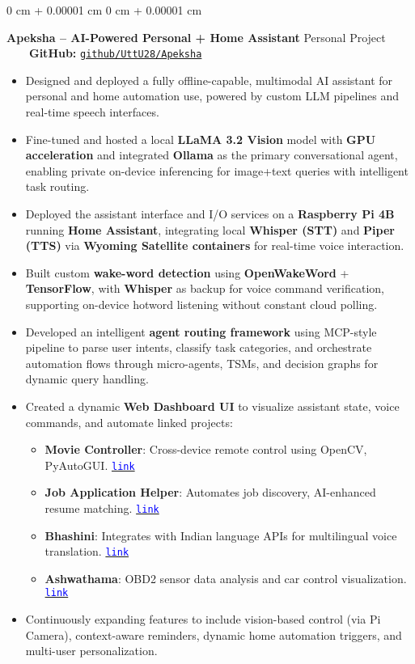 \documentclass[10pt, letterpaper]{article}
\newenvironment{highlights}{
    \begin{itemize}[
        topsep=0.10 cm,
        parsep=0.10 cm,
        partopsep=0pt,
        itemsep=0pt,
        leftmargin=0 cm + 10pt
    ]
}{
    \end{itemize}
} %
\newenvironment{onecolentry}{
    \begin{adjustwidth}{
        0 cm + 0.00001 cm
    }{
        0 cm + 0.00001 cm
    }
}{
    \end{adjustwidth}
} %
\begin{document}
\begin{onecolentry}
	\textbf{Apeksha – AI-Powered Personal + Home Assistant} \hfill Personal Project \ \ \ \ \textbf{GitHub:} \href{https://github.com/UttU28/Apeksha}{\texttt{github/UttU28/Apeksha}}
	
	\begin{highlights}
		\item Designed and deployed a fully offline-capable, multimodal AI assistant for personal and home automation use, powered by custom LLM pipelines and real-time speech interfaces.
		\item Fine-tuned and hosted a local \textbf{LLaMA 3.2 Vision} model with \textbf{GPU acceleration} and integrated \textbf{Ollama} as the primary conversational agent, enabling private on-device inferencing for image+text queries with intelligent task routing.
		\item Deployed the assistant interface and I/O services on a \textbf{Raspberry Pi 4B} running \textbf{Home Assistant}, integrating local \textbf{Whisper (STT)} and \textbf{Piper (TTS)} via \textbf{Wyoming Satellite containers} for real-time voice interaction.
		\item Built custom \textbf{wake-word detection} using \textbf{OpenWakeWord} + \textbf{TensorFlow}, with \textbf{Whisper} as backup for voice command verification, supporting on-device hotword listening without constant cloud polling.
		\item Developed an intelligent \textbf{agent routing framework} using MCP-style pipeline to parse user intents, classify task categories, and orchestrate automation flows through micro-agents, TSMs, and decision graphs for dynamic query handling.
		\item Created a dynamic \textbf{Web Dashboard UI} to visualize assistant state, voice commands, and automate linked projects:
			\begin{highlights}
				\item \textbf{Movie Controller}: Cross-device remote control using OpenCV, PyAutoGUI. \href{https://github.com/UttU28/Movie_Controller_2}{\textcolor{blue}{\texttt{link}}}
				\item \textbf{Job Application Helper}: Automates job discovery, AI-enhanced resume matching. \href{https://github.com/UttU28/Job-Application-Helper}{\textcolor{blue}{\texttt{link}}}
				\item \textbf{Bhashini}: Integrates with Indian language APIs for multilingual voice translation. \href{https://github.com/UttU28/Apeksha_Frontend/}{\textcolor{blue}{\texttt{link}}}
				\item \textbf{Ashwathama}: OBD2 sensor data analysis and car control visualization. \href{https://github.com/UttU28/Apeksha_Frontend/}{\textcolor{blue}{\texttt{link}}}
			\end{highlights}
		\item Continuously expanding features to include vision-based control (via Pi Camera), context-aware reminders, dynamic home automation triggers, and multi-user personalization.
	\end{highlights}
\end{onecolentry}
	
\end{document}
